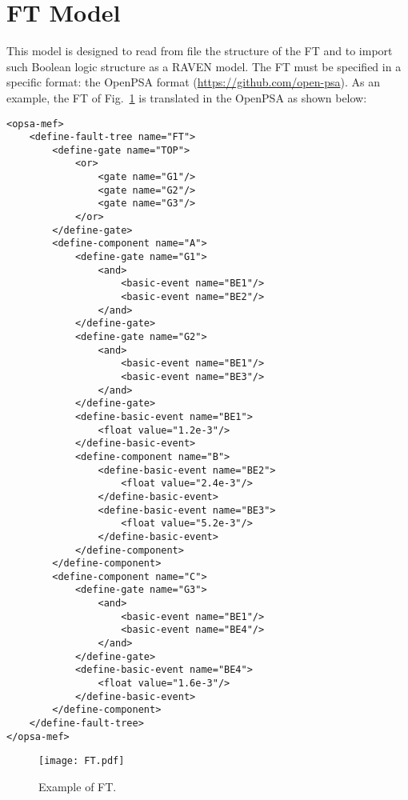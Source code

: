 \section{FT Model}
\label{sec:FTmodel}

This model is designed to read from file the structure of the FT and to import such Boolean logic structure as a RAVEN model.
The FT must be specified in a specific format: the OpenPSA format (\href{<url>}{https://github.com/open-psa}). 
As an example, the FT of Fig.~\ref{fig:FT} is translated in the OpenPSA as shown below:

\begin{lstlisting}[style=XML,morekeywords={anAttribute},caption=FT in OpenPSA format., label=lst:FTmodel]
<opsa-mef>
    <define-fault-tree name="FT">
        <define-gate name="TOP">
            <or>
                <gate name="G1"/>
                <gate name="G2"/>
                <gate name="G3"/>
            </or>
        </define-gate>
        <define-component name="A">
            <define-gate name="G1">
                <and>
                    <basic-event name="BE1"/>
                    <basic-event name="BE2"/>
                </and>
            </define-gate>
            <define-gate name="G2">
                <and>
                    <basic-event name="BE1"/>
                    <basic-event name="BE3"/>
                </and>
            </define-gate>
            <define-basic-event name="BE1">
                <float value="1.2e-3"/>
            </define-basic-event>
            <define-component name="B">
                <define-basic-event name="BE2">
                    <float value="2.4e-3"/>
                </define-basic-event>
                <define-basic-event name="BE3">
                    <float value="5.2e-3"/>
                </define-basic-event>
            </define-component>
        </define-component>
        <define-component name="C">
            <define-gate name="G3">
                <and>
                    <basic-event name="BE1"/>
                    <basic-event name="BE4"/>
                </and>
            </define-gate>
            <define-basic-event name="BE4">
                <float value="1.6e-3"/>
            </define-basic-event>
        </define-component>
    </define-fault-tree>
</opsa-mef>
\end{lstlisting} 

\begin{figure}
    \centering
    \centerline{\texttt{[image: FT.pdf]}} 
    \caption{Example of FT.}
    \label{fig:FT}
\end{figure}

